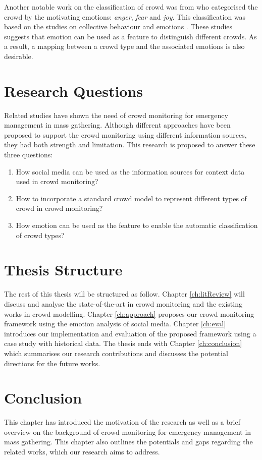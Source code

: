 Another notable work on the classification of crowd was from \citet{Lofland1985} who categorised the crowd by the motivating emotions: \textit{anger}, \textit{fear} and \textit{joy}. This classification was based on the studies on collective behaviour and emotions \citep{Lofland1985,Smelser1998,Brown1954}. These studies suggests that emotion can be used as a feature to distinguish different crowds. As a result, a mapping between a crowd type and the associated emotions is also desirable. 

\section{Research Questions}
Related studies have shown the need of crowd monitoring for emergency management in mass gathering. Although different approaches have been proposed to support the crowd monitoring using different information sources, they had both strength and limitation. This research is proposed to answer these three questions:
\begin{enumerate}
\item How social media can be used as the information sources for context data used in crowd monitoring?
\item How to incorporate a standard crowd model to represent different types of crowd in crowd monitoring?
\item How emotion can be used as the feature to enable the automatic classification of crowd types?
\end{enumerate}

\section{Thesis Structure}
The rest of this thesis will be structured as follow. Chapter \ref{ch:litReview} will discuss and analyse the state-of-the-art in crowd monitoring and the existing works in crowd modelling. Chapter \ref{ch:approach} proposes our crowd monitoring framework using the emotion analysis of social media. Chapter \ref{ch:eval} introduces our implementation and evaluation of the proposed framework using a case study with historical data. The thesis ends with Chapter \ref{ch:conclusion} which summarises our research contributions and discusses the potential directions for the future works.

\section{Conclusion}
This chapter has introduced the motivation of the research as well as a brief overview on the background of crowd monitoring for emergency management in mass gathering. This chapter also outlines the potentials and gaps regarding the related works, which our research aims to address.